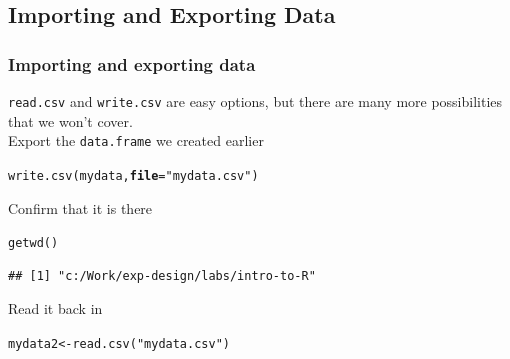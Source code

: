 \documentclass[color=usenames,dvipsnames]{beamer}\usepackage[]{graphicx}\usepackage[]{color}
\makeatletter
\newcommand{\hlstr}[1]{\textcolor[rgb]{0.749,0.012,0.012}{#1}}%
\newcommand{\hlstd}[1]{\textcolor[rgb]{0,0,0}{#1}}%
\newcommand{\hlkwb}[1]{\textcolor[rgb]{0,0.341,0.682}{#1}}%
\newcommand{\hlkwc}[1]{\textcolor[rgb]{0,0,0}{\textbf{#1}}}%
\newcommand{\hlkwd}[1]{\textcolor[rgb]{0.004,0.004,0.506}{#1}}%
\newenvironment{kframe}{%
 \def\at@end@of@kframe{}%
 \ifinner\ifhmode%
  \def\at@end@of@kframe{\end{minipage}}%
  \begin{minipage}{\columnwidth}%
 \fi\fi%
 \def\FrameCommand##1{\hskip\@totalleftmargin \hskip-\fboxsep
 \colorbox{shadecolor}{##1}\hskip-\fboxsep
     \hskip-\linewidth \hskip-\@totalleftmargin \hskip\columnwidth}%
 \MakeFramed {\advance\hsize-\width
   \@totalleftmargin\z@ \linewidth\hsize
   \@setminipage}}%
 {\par\unskip\endMakeFramed%
 \at@end@of@kframe}
\newenvironment{knitrout}{}{} %
\makeatother
\begin{document}
\subsection{Importing and Exporting Data}

\begin{frame}[fragile]
  \frametitle{Importing and exporting data}
  \verb+read.csv+ and \verb+write.csv+ are easy options, but there are
  many more possibilities that we won't cover. \\
  \small
  \pause \vfill
  Export the \verb+data.frame+ we created earlier
\begin{knitrout}\small
{}\color{fgcolor}\begin{kframe}
\begin{alltt}
\hlkwd{write.csv}\hlstd{(mydata,} \hlkwc{file}\hlstd{=}\hlstr{"mydata.csv"}\hlstd{)}
\end{alltt}
\end{kframe}
\end{knitrout}
  \pause \vfill
Confirm that it is there
\begin{knitrout}\small
{}\color{fgcolor}\begin{kframe}
\begin{alltt}
\hlkwd{getwd}\hlstd{()}
\end{alltt}
\begin{verbatim}
## [1] "c:/Work/exp-design/labs/intro-to-R"
\end{verbatim}
\end{kframe}
\end{knitrout}
  \pause \vfill
Read it back in
\begin{knitrout}\small
{}\color{fgcolor}\begin{kframe}
\begin{alltt}
\hlstd{mydata2} \hlkwb{<-} \hlkwd{read.csv}\hlstd{(}\hlstr{"mydata.csv"}\hlstd{)}
\end{alltt}
\end{kframe}
\end{knitrout}
\end{frame}
\end{document}
